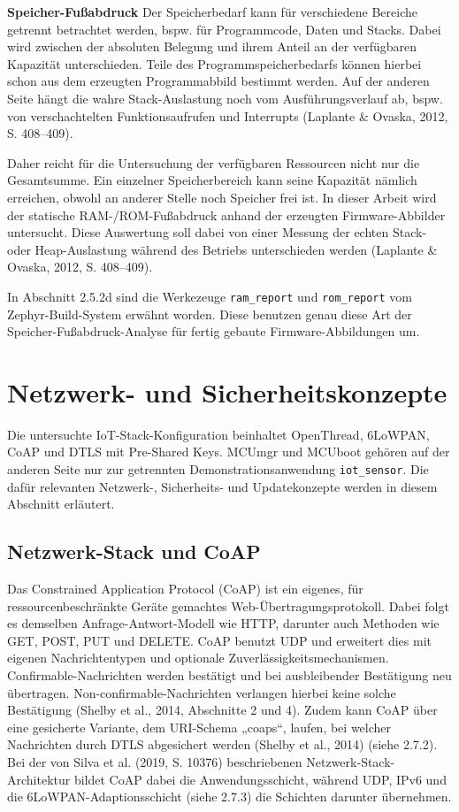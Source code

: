 \textbf{Speicher-Fußabdruck }Der Speicherbedarf kann für verschiedene Bereiche getrennt betrachtet werden, bspw. für Programmcode, Daten und Stacks. Dabei wird zwischen der absoluten Belegung und ihrem Anteil an der verfügbaren Kapazität unterschieden. Teile des Programmspeicherbedarfs können hierbei schon aus dem erzeugten Programmabbild bestimmt werden. Auf der anderen Seite hängt die wahre Stack-Auslastung noch vom Ausführungsverlauf ab, bspw. von verschachtelten Funktionsaufrufen und Interrupts (Laplante \& Ovaska, 2012, S. 408–409).

Daher reicht für die Untersuchung der verfügbaren Ressourcen nicht nur die Gesamtsumme. Ein einzelner Speicherbereich kann seine Kapazität nämlich erreichen, obwohl an anderer Stelle noch Speicher frei ist. In dieser Arbeit wird der statische RAM-/ROM-Fußabdruck anhand der erzeugten Firmware-Abbilder untersucht. Diese Auswertung soll dabei von einer Messung der echten Stack- oder Heap-Auslastung während des Betriebs unterschieden werden (Laplante \& Ovaska, 2012, S. 408–409).

In Abschnitt 2.5.2d sind die Werkezeuge \lstinline[style=fileinline]|ram_report| und \lstinline[style=fileinline]|rom_report| vom Zephyr-Build-System erwähnt worden. Diese benutzen genau diese Art der Speicher-Fußabdruck-Analyse für fertig gebaute Firmware-Abbildungen um.

\section{Netzwerk- und Sicherheitskonzepte}
Die untersuchte IoT-Stack-Konfiguration beinhaltet OpenThread, 6LoWPAN, CoAP und DTLS mit Pre-Shared Keys. MCUmgr und MCUboot gehören auf der anderen Seite nur zur getrennten Demonstrationsanwendung \lstinline[style=fileinline]|iot_sensor|. Die dafür relevanten Netzwerk-, Sicherheits- und Updatekonzepte werden in diesem Abschnitt erläutert.

\subsection{Netzwerk-Stack und CoAP}
Das Constrained Application Protocol (CoAP) ist ein eigenes, für ressourcenbeschränkte Geräte gemachtes Web-Übertragungsprotokoll. Dabei folgt es demselben Anfrage-Antwort-Modell wie HTTP, darunter auch Methoden wie GET, POST, PUT und DELETE. CoAP benutzt UDP und erweitert dies mit eigenen Nachrichtentypen und optionale Zuverlässigkeitsmechanismen. Confirmable-Nachrichten werden bestätigt und bei ausbleibender Bestätigung neu übertragen. Non-confirmable-Nachrichten verlangen hierbei keine solche Bestätigung (Shelby et al., 2014, Abschnitte 2 und 4). Zudem kann CoAP über eine gesicherte Variante, dem URI-Schema „coaps“, laufen, bei welcher Nachrichten durch DTLS abgesichert werden (Shelby et al., 2014) (siehe 2.7.2). Bei der von Silva et al. (2019, S. 10376) beschriebenen Netzwerk-Stack-Architektur bildet CoAP dabei die Anwendungsschicht, während UDP, IPv6 und die 6LoWPAN-Adaptionsschicht (siehe 2.7.3) die Schichten darunter übernehmen.

